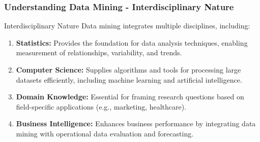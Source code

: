 \documentclass[aspectratio=169]{beamer}
\begin{document}
\begin{frame}[fragile]
    \frametitle{Understanding Data Mining - Interdisciplinary Nature}
    \begin{block}{Interdisciplinary Nature}
        Data mining integrates multiple disciplines, including:
        \begin{enumerate}
            \item \textbf{Statistics:} Provides the foundation for data analysis techniques, enabling measurement of relationships, variability, and trends.
            \item \textbf{Computer Science:} Supplies algorithms and tools for processing large datasets efficiently, including machine learning and artificial intelligence.
            \item \textbf{Domain Knowledge:} Essential for framing research questions based on field-specific applications (e.g., marketing, healthcare).
            \item \textbf{Business Intelligence:} Enhances business performance by integrating data mining with operational data evaluation and forecasting.
        \end{enumerate}
    \end{block}
\end{frame}
\end{document}
